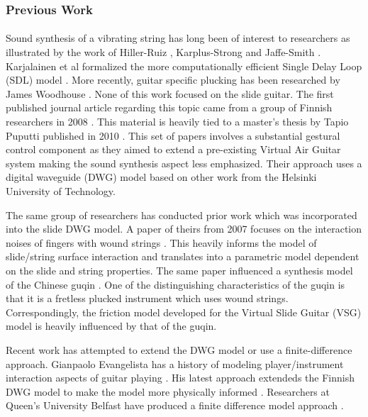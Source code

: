 \documentclass[12pt]{article}
\begin{document}
\subsubsection*{Previous Work}
\paragraph{}
Sound synthesis of a vibrating string has long been of interest to researchers as illustrated by the work of Hiller-Ruiz \cite{hiller_synthesizing_1971}, Karplus-Strong \cite{karplus_digital_1983} and Jaffe-Smith \cite{jaffe_extensions_1983}. Karjalainen et al formalized the more computationally efficient Single Delay Loop (SDL) model \cite{karjalainen_plucked-string_1998}. More recently, guitar specific plucking has been researched by James Woodhouse \cite{woodhouse_synthesis_2004}. None of this work focused on the slide guitar. The first published journal article regarding this topic came from a group of Finnish researchers in 2008 \cite{pakarinen_virtual_2008}. This material is heavily tied to a master’s thesis by Tapio Puputti published in 2010 \cite{puputti_real-time_2012}. This set of papers involves a substantial gestural control component as they aimed to extend a pre-existing Virtual Air Guitar system making the sound synthesis aspect less emphasized. Their approach uses a digital waveguide (DWG) model based on other work from the Helsinki University of Technology.

The same group of researchers has conducted prior work which was incorporated into the slide DWG model. A paper of theirs from 2007 focuses on the interaction noises of fingers with wound strings \cite{pakarinen_analysis_2007}. This heavily informs the model of slide/string surface interaction and translates into a parametric model dependent on the slide and string properties. The same paper influenced a synthesis model of the Chinese guqin \cite{penttinen_model-based_2006}. One of the distinguishing characteristics of the guqin is that it is a fretless plucked instrument which uses wound strings. Correspondingly, the friction model developed for the Virtual Slide Guitar (VSG) model is heavily influenced by that of the guqin.

Recent work has attempted to extend the DWG model or use a finite-difference approach. Gianpaolo Evangelista has a history of modeling player/instrument interaction aspects of guitar playing \cite{evangelista_physical_2011} \cite{evangelista_playerinstrument_2010}. His latest approach extendeds the Finnish DWG model to make the model more physically informed \cite{evangelista_physical_2012}. Researchers at Queen’s University Belfast have produced a finite difference model approach \cite{bhanuprakash_finite_2020}.
\end{document}
